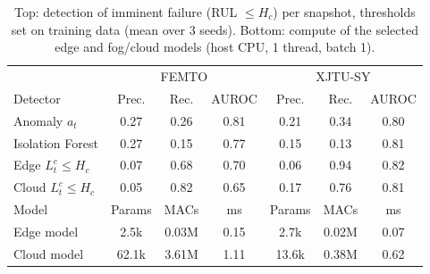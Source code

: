 \begin{table}[t]
\centering
\caption{Top: detection of imminent failure (RUL $\le H_c$) per snapshot, thresholds set on training data (mean over 3 seeds). Bottom: compute of the selected edge and fog/cloud models (host CPU, 1 thread, batch 1).}
\label{tab:detect}
\footnotesize\setlength{\tabcolsep}{2.4pt}
\begin{tabular}{l|ccc|ccc}
\toprule
 & \multicolumn{3}{c|}{FEMTO} & \multicolumn{3}{c}{XJTU-SY} \\
Detector & Prec. & Rec. & AUROC & Prec. & Rec. & AUROC \\
\midrule
Anomaly $a_t$ & 0.27 & 0.26 & 0.81 & 0.21 & 0.34 & 0.80 \\
Isolation Forest & 0.27 & 0.15 & 0.77 & 0.15 & 0.13 & 0.81 \\
Edge $L^e_t\le H_c$ & 0.07 & 0.68 & 0.70 & 0.06 & 0.94 & 0.82 \\
Cloud $L^c_t\le H_c$ & 0.05 & 0.82 & 0.65 & 0.17 & 0.76 & 0.81 \\
\midrule
Model & Params & MACs & ms & Params & MACs & ms \\
\midrule
Edge model & 2.5k & 0.03M & 0.15 & 2.7k & 0.02M & 0.07 \\
Cloud model & 62.1k & 3.61M & 1.11 & 13.6k & 0.38M & 0.62 \\
\bottomrule
\end{tabular}
\end{table}
